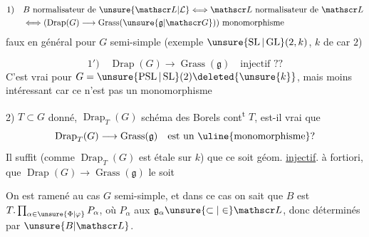 \[
\begin{aligned}
1)\quad &B\text{ normalisateur de }\unsure{\mathscr L|\mathcal L}\Longleftrightarrow\mathscr L\text{ normalisateur de }\mathscr L\\
&\Longleftrightarrow(\operatorname{Drap}(G)\longrightarrow\operatorname{Grass}(\unsure{\mathfrak g|\mathscr G}))\text{ monomorphisme}
\end{aligned}
\]
faux en général pour $G$ semi-simple   (exemple $\unsure{\operatorname{SL}|\operatorname{GL}}(2,k)$, $k$ de car $2$)


\[
1')\quad\operatorname{Drap}(G)\longrightarrow\operatorname{Grass}(\mathfrak g)\quad\text{injectif ??}
\]
C'est vrai pour $G=\unsure{\operatorname{PSL}|\operatorname{SL}}(2)\deleted{\unsure{k}}$, mais moins intéressant car ce n'est pas un monomorphisme

2) $T\subset G$  donné, $\operatorname{Drap}_{T}(G)$ schéma des Borels cont\textsuperscript{t} $T$, est-il vrai que
\[
\operatorname{Drap}_{T}(G)\longrightarrow\operatorname{Grass}(\mathfrak g)\quad\text{est un \uline{monomorphisme}?}
\]
 Il suffit (comme $\operatorname{Drap}_{T}(G)$ est étale sur $k$) que ce soit géom. \uline{injectif}. à fortiori, que $\operatorname{Drap}(G)\to\operatorname{Grass}(\mathfrak g)$ le soit

 On est ramené au cas $G$ semi-simple, et dans ce cas on sait que $B$ est  $T.\prod_{\alpha\in\unsure{\Phi|\varphi}}P_\alpha$, où    $P_\alpha$     aux $\mathfrak g_\alpha\unsure{\subset|\in}\mathscr L$, donc déterminés par $\unsure{B|\mathscr L}$.
